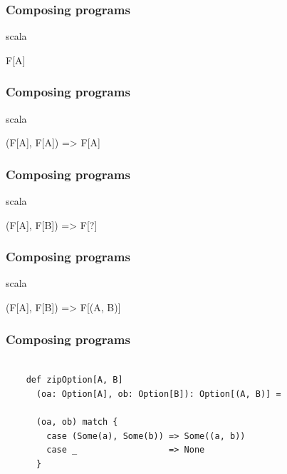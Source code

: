 \documentclass{beamer}
\begin{document}
\begin{frame}[fragile]

  \frametitle{Composing programs}

  \centering
  \Large

  \begin{cminted}{scala}

F[A]

  \end{cminted}

\end{frame}

\begin{frame}[fragile]

  \frametitle{Composing programs}

  \centering
  \Large

  \begin{cminted}{scala}

(F[A], F[A]) => F[A]

  \end{cminted}

\end{frame}

\begin{frame}[fragile]

  \frametitle{Composing programs}

  \centering
  \Large

  \begin{cminted}{scala}

(F[A], F[B]) => F[?]

  \end{cminted}

\end{frame}

\begin{frame}[fragile]

  \frametitle{Composing programs}

  \centering
  \Large

  \begin{cminted}{scala}

(F[A], F[B]) => F[(A, B)]

  \end{cminted}

\end{frame}

\begin{frame}[fragile]

  \frametitle{Composing programs}

  \begin{verbatim}

    def zipOption[A, B]
      (oa: Option[A], ob: Option[B]): Option[(A, B)] =

      (oa, ob) match {
        case (Some(a), Some(b)) => Some((a, b))
        case _                  => None
      }

  \end{verbatim}

\end{frame}
\end{document}
